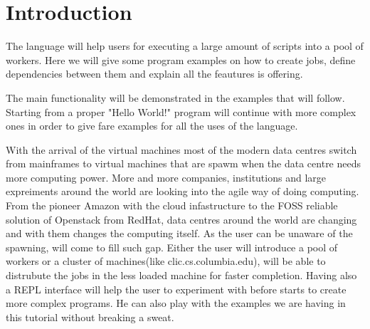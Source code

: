 \section{Introduction}
\label{sect:intro}
The \lang{} language will help users for executing a large amount of scripts into a pool of workers.
Here we will give some program examples on how to create jobs, define dependencies between them and
explain all the feautures \lang{} is offering.


The main functionality will be demonstrated in the examples that will follow. Starting from a 
proper "Hello World!" program will continue with more complex ones in order to give fare examples
for all the uses of the language.


With the arrival of the virtual machines most of the modern data centres switch from mainframes to
virtual machines that are spawm when the data centre needs more computing power. More and more companies,
institutions and large expreiments around the world are looking into the agile way of doing computing. From the
pioneer Amazon with the cloud infastructure to the FOSS reliable solution of Openstack from RedHat,
data centres around the world are changing and with them changes the computing itself.
As the user can be unaware of the spawning, \lang{} will come to fill such gap. Either the user will
introduce a pool of workers or a cluster of machines(like clic.cs.columbia.edu), \lang{} will be 
able to distrubute the jobs in the less loaded machine for faster completion. Having also a REPL
interface will help the user to experiment with \lang{} before starts to create more complex 
programs. He can also play with the examples we are having in this tutorial without breaking a sweat.
